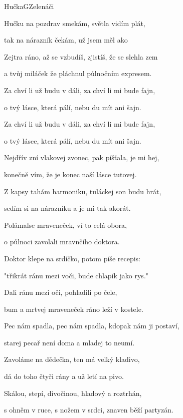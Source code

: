 \setcounter{page}{32}
\begin{song}{Hučka}{G}{Zelenáči}
\begin{SBVerse}
Hučku  na pozdrav smekám, světla  vidím plát,

tak na  nárazník čekám, už jsem  měl ako

Zejtra ráno, až se vzbudíš, zjistíš, že se slehla zem

a tvůj miláček že pláchnul půlnočním expresem.
\end{SBVerse}
\begin{SBChorus}
Za chví li už budu v dáli, za chví li mi bude fajn,

o tvý  lásce, která pálí, nebu du mít ani  šajn.

Za chví li už budu v dáli, za chví li mi bude fajn,

o tvý  lásce, která pálí, nebu du mít ani  šajn.
\end{SBChorus}
\begin{SBVerse}
Nejdřív zní vlakovej zvonec, pak píšťala, je mi hej,

konečně vím, že je konec naší lásce tutovej.

Z kapsy tahám harmoniku, tuláckej son budu hrát,

sedím si na nárazníku a je mi tak akorát. 
\end{SBVerse}
\begin{SBVerse}
Polámalse mraveneček, ví to celá obora,

o půlnoci zavolali mravnčího doktora.

Doktor klepe na srdíčko, potom píše recepis:

"třikrát ránu mezi voči, bude chlapík jako rys."

Dali ránu mezi oči, pohladili po čele,

bum a mrtvej mraveneček ráno leží v kostele.
\end{SBVerse}
\begin{SBVerse}
Pec nám spadla, pec nám spadla, kdopak nám ji postaví,

starej pecař není doma a mladej to neumí.

Zavoláme na dědečka, ten má velký kladivo,

dá do toho čtyři rány a už letí na pivo.
\end{SBVerse}
\begin{SBVerse}
Skálou, stepí, divočinou, hladový a roztrhán,

s ohněm v ruce, s nožem v srdci, znaven běží partyzán.
\end{SBVerse}
\end{song}

\pagebreak
